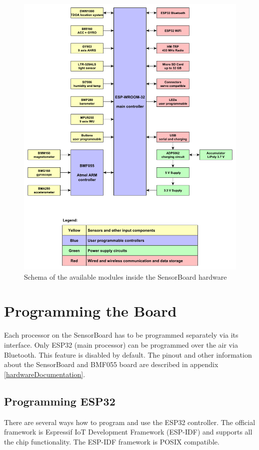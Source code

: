 \begin{figure}
	\centering
	\label{fig:SWmodules}
	\caption{Schema of the available modules inside the SensorBoard hardware}
	\includegraphics[width=\linewidth]{img/SensorBoardSchema.pdf}
\end{figure}

\section{Programming the Board}
Each processor on the SensorBoard has to be programmed separately via its interface. Only ESP32 \cite{espressif:ESP-WROOM-32} (main processor) can be programmed over the air via Bluetooth. This feature is disabled by default. The pinout and other information about the SensorBoard and BMF055 board are described in appendix \ref{hardwareDocumentation}.

\subsection{Programming ESP32}
There are several ways how to program and use the ESP32 \cite{espressif:ESP-WROOM-32} controller. The official framework is Espressif \ac{IoT} Development Framework (\ac{ESP-IDF}) \cite{espressif:ESP-IDF} and supports all the chip functionality. The \ac{ESP-IDF} framework is \ac{POSIX} compatible.

